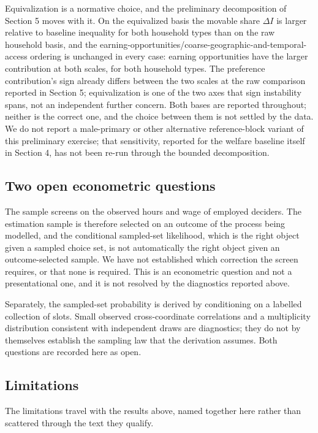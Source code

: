 \documentclass[11pt,a4paper]{article}
\begin{document}
Equivalization is a normative choice, and the preliminary decomposition of Section 5 moves with it. On the equivalized basis the movable share \(\Delta I\) is larger relative to baseline inequality for both household types than on the raw household basis, and the earning-opportunities/coarse-geographic-and-temporal-access ordering is unchanged in every case: earning opportunities have the larger contribution at both scales, for both household types. The preference contribution's sign already differs between the two scales at the raw comparison reported in Section 5; equivalization is one of the two axes that sign instability spans, not an independent further concern. Both bases are reported throughout; neither is the correct one, and the choice between them is not settled by the data. We do not report a male-primary or other alternative reference-block variant of this preliminary exercise; that sensitivity, reported for the welfare baseline itself in Section 4, has not been re-run through the bounded decomposition.

\subsection{Two open econometric questions}\label{two-open-econometric-questions}

The sample screens on the observed hours and wage of employed deciders. The estimation sample is therefore selected on an outcome of the process being modelled, and the conditional sampled-set likelihood, which is the right object given a sampled choice set, is not automatically the right object given an outcome-selected sample. We have not established which correction the screen requires, or that none is required. This is an econometric question and not a presentational one, and it is not resolved by the diagnostics reported above.

Separately, the sampled-set probability is derived by conditioning on a labelled collection of slots. Small observed cross-coordinate correlations and a multiplicity distribution consistent with independent draws are diagnostics; they do not by themselves establish the sampling law that the derivation assumes. Both questions are recorded here as open.

\subsection{Limitations}\label{limitations}

The limitations travel with the results above, named together here rather than scattered through the text they qualify.
\end{document}

